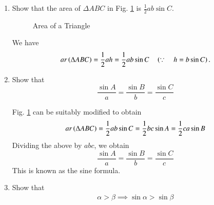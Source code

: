 \renewcommand{\theequation}{\theenumi}
\begin{enumerate}[label=\thesection.\arabic*.,ref=\thesection.\theenumi]

\item
\label{prob:tri_area_sin}
	Show that the area of $\Delta ABC$ in Fig. 	\ref{fig:tri_sss}	is $\frac{1}{2}ab \sin C$.
\begin{figure}[!ht]
	\begin{center}
			\resizebox{\columnwidth}{!}{}
	\end{center}
	\caption{Area of a Triangle}
	\label{fig:tri_sss}	
\end{figure}

\solution We have
%
\begin{equation}
ar\left(\Delta ABC\right) = \frac{1}{2}ah = \frac{1}{2}ab\sin C \quad \left(\because \quad h = b \sin C\right).
\label{eq:tri_area_sin}
\end{equation}

\item
	Show that 
	\begin{equation}
	\frac{\sin A}{a} = \frac{\sin B}{b} = \frac{\sin C}{c}
	\end{equation}

\solution Fig. \ref{fig:tri_sss} can be suitably modified to obtain 
\begin{align}
ar\left(\Delta ABC\right) = 
\frac{1}{2}ab\sin C = \frac{1}{2}bc\sin A = \frac{1}{2}ca\sin B
	\label{tri:area-sin}
\end{align}
Dividing the above by $abc$, we obtain
	\begin{equation}
\label{eq:tri_sin_form}
	\frac{\sin A}{a} = \frac{\sin B}{b} = \frac{\sin C}{c}
	\end{equation}
This is known as the sine formula.	
%
%
\item Show that 
%
\begin{align}
\label{eq:trig_id_sin_inc}
\alpha > \beta \implies \sin \alpha > \sin \beta
\end{align}
%

\begin{figure}[!ht]
	\begin{center}
		

\end{center}
\end{figure}
\end{enumerate}
